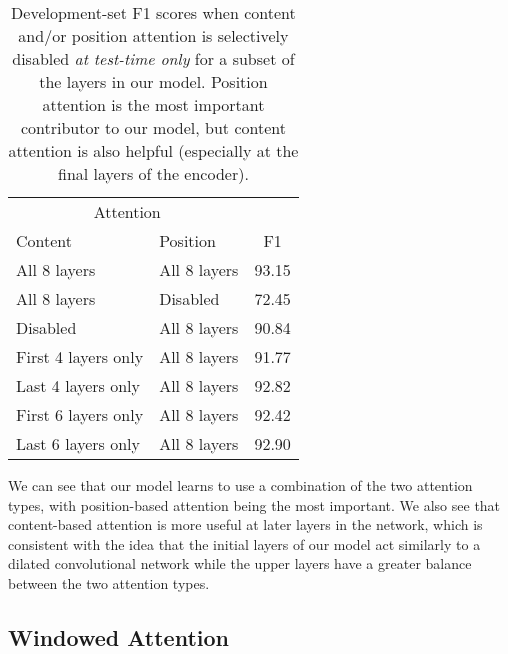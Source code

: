 \documentclass[11pt,a4paper]{article}
\begin{document}
\begin{table}[t!]
\begin{center}
\begin{tabular}{@{}llc@{}}
\toprule
\multicolumn{2}{c}{Attention}\\
\cmidrule{1-2}
Content & Position & F1\\
\midrule
All 8 layers & All 8 layers & 93.15 \\
All 8 layers & Disabled & 72.45 \\
Disabled & All 8 layers & 90.84 \\
First 4 layers only & All 8 layers & 91.77 \\
Last 4 layers only & All 8 layers & 92.82 \\
First 6 layers only & All 8 layers & 92.42 \\
Last 6 layers only & All 8 layers & 92.90 \\
\bottomrule
\end{tabular}
\end{center}
\caption{
\label{table:content-position-disable}
Development-set F1 scores when content and/or position attention is selectively disabled \emph{at test-time only} for a subset of the layers in our model. Position attention is the most important contributor to our model, but content attention is also helpful (especially at the final layers of the encoder).
}
\end{table}

We can see that our model learns to use a combination of the two attention types, with position-based attention being the most important. We also see that content-based attention is more useful at later layers in the network, which is consistent with the idea that the initial layers of our model act similarly to a dilated convolutional network while the upper layers have a greater balance between the two attention types.

\subsection{Windowed Attention}
\end{document}
